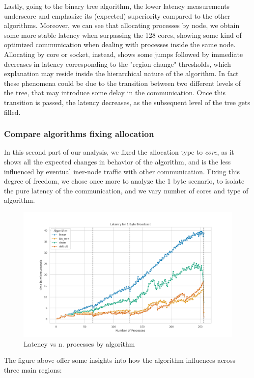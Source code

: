 \documentclass{article}
\begin{document}
	Lastly, going to the binary tree algorithm, the lower latency measurements underscore and emphasize its (expected) superiority compared to the other algorithms. Moreover, we can see that allocating processes by node, we obtain some more stable latency when surpassing the 128 cores, showing some kind of optimized communication when dealing with processes inside the same node.
	Allocating by core or socket, instead, shows some jumps followed by immediate decreases in latency corresponding to the "region change" thresholds, which explanation may reside inside the hierarchical nature of the algorithm. In fact these phenomena could be due to the transition between two different levels of the tree, that may introduce some delay in the communication. Once this transition is passed, the latency decreases, as the subsequent level of the tree gets filled.
	
	\subsubsection{Compare algorithms fixing allocation}
	
	In this second part of our analysis, we fixed the allocation type to \textit{core}, as it shows all the expected changes in behavior of the algorithm, and is the less influenced by eventual iner-node traffic with other communication. Fixing this degree of freedom, we chose once more to analyze the 1 byte scenario, to isolate the pure latency of the communication, and we vary number of cores and type of algorithm.
	
	\begin{figure}[h]
		\centering
		\includegraphics[width=0.7\linewidth]{../exercise1/plots/bcast_all_1byte}
		\caption{Latency vs n. processes by algorithm}
		\label{fig:bcastall1byte}
	\end{figure}
	
	
	The figure above offer some insights into how the algorithm influences across three main regions:
	
\end{document}
